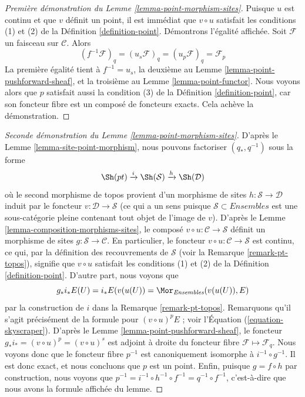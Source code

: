 \begin{proof}[Première démonstration du Lemme \ref{lemma-point-morphism-sites}]
Puisque $u$ est continu et que $v$ définit un point,
il est immédiat que $v \circ u$ satisfait les conditions (1) et (2) de la
Définition \ref{definition-point}. Démontrons l’égalité affichée.
Soit $\mathcal{F}$ un faisceau sur $\mathcal{C}$. Alors
$$
(f^{-1}\mathcal{F})_q = (u_s\mathcal{F})_q =
(u_p \mathcal{F})_q = \mathcal{F}_p
$$
La première égalité tient à $f^{-1} = u_s$, la deuxième au
Lemme \ref{lemma-point-pushforward-sheaf}, et la troisième
au Lemme \ref{lemma-point-functor}.
Nous voyons alors que $p$ satisfait aussi la condition (3) de la
Définition \ref{definition-point},
car son foncteur fibre est un composé de foncteurs exacts. Cela achève la démonstration.
\end{proof}

\begin{proof}[Seconde démonstration du Lemme \ref{lemma-point-morphism-sites}]
D’après le
Lemme \ref{lemma-site-point-morphism},
nous pouvons factoriser $(q_*, q^{-1})$ sous la forme
$$
\Sh(pt) \xrightarrow{i} \Sh(\mathcal{S})
\xrightarrow{h} \Sh(\mathcal{D})
$$
où le second morphisme de topos provient d’un morphisme de sites
$h : \mathcal{S} \to \mathcal{D}$ induit par le foncteur
$v : \mathcal{D} \to \mathcal{S}$ (ce qui a un sens puisque
$\mathcal{S} \subset \textit{Ensembles}$ est une sous-catégorie pleine contenant
tout objet de l’image de $v$). D’après le
Lemme \ref{lemma-composition-morphisms-sites},
le composé $v \circ u : \mathcal{C} \to \mathcal{S}$
définit un morphisme de sites $g : \mathcal{S} \to \mathcal{C}$.
En particulier, le foncteur
$v \circ u : \mathcal{C} \to \mathcal{S}$
est continu, ce qui, par la définition des recouvrements
de $\mathcal{S}$ (voir la
Remarque \ref{remark-pt-topos}),
signifie que $v \circ u$ satisfait les conditions (1) et (2) de la
Définition \ref{definition-point}.
D’autre part, nous voyons que
$$
g_*i_*E(U) = i_*E(v(u(U)) = \Mor_{\textit{Ensembles}}(v(u(U)), E)
$$
par la construction de $i$ dans la
Remarque \ref{remark-pt-topos}.
Remarquons qu’il s’agit précisément de la formule pour
$(v \circ u)^pE$ ; voir l’Équation (\ref{equation-skyscraper}).
D’après le
Lemme \ref{lemma-point-pushforward-sheaf},
le foncteur $g_*i_* = (v \circ u)^p = (v \circ u)^s$
est adjoint à droite du foncteur fibre
$\mathcal{F} \mapsto \mathcal{F}_q$.
Nous voyons donc que le foncteur fibre $p^{-1}$ est canoniquement
isomorphe à $i^{-1} \circ g^{-1}$. Il est donc exact, et
nous concluons que $p$ est un point. Enfin, puisque
$g = f \circ h$ par construction, nous voyons que
$p^{-1} = i^{-1} \circ h^{-1} \circ f^{-1} = q^{-1} \circ f^{-1}$,
c’est-à-dire que nous avons la formule affichée du lemme.
\end{proof}

